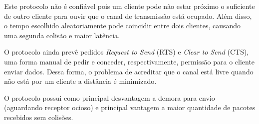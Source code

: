\documentclass[brazilian,a4paper]{article}
\begin{document}
Este protocolo não é confiável pois um cliente pode não estar próximo o suficiente de outro cliente para ouvir que o canal de transmissão está ocupado. Além disso, o tempo escolhido aleatoriamente pode coincidir entre dois clientes, causando uma segunda colisão e maior latência.

O protocolo ainda prevê pedidos \textit{Request to Send} (RTS) e \textit{Clear to Send} (CTS), uma forma manual de pedir e conceder, respectivamente, permissão para o cliente enviar dados. Dessa forma, o problema de acreditar que o canal está livre quando não está por um cliente a distância é minimizado.

O protocolo possui como principal desvantagem a demora para envio (aguardando receptor ocioso) e principal vantagem a maior quantidade de pacotes recebidos sem colisões.
\end{document}

